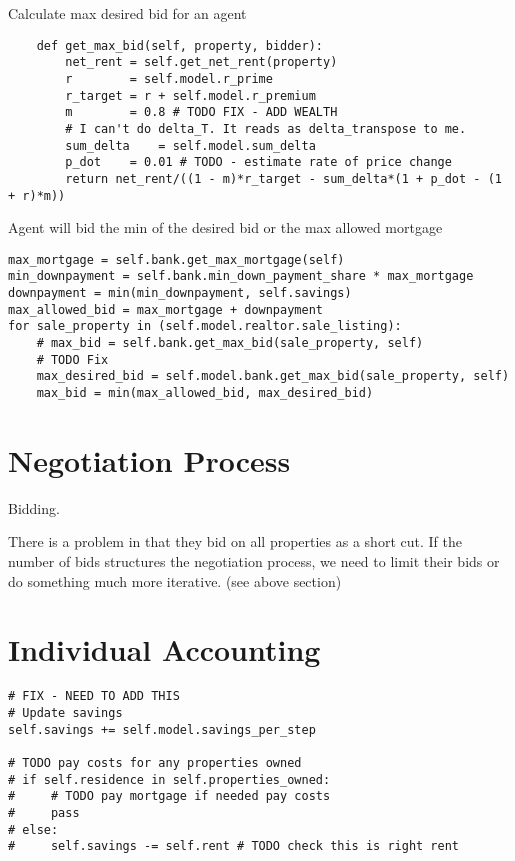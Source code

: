 Calculate max desired bid for an agent
\begin{lstlisting}
    def get_max_bid(self, property, bidder):
        net_rent = self.get_net_rent(property)
        r        = self.model.r_prime   
        r_target = r + self.model.r_premium
        m        = 0.8 # TODO FIX - ADD WEALTH
        # I can't do delta_T. It reads as delta_transpose to me.
        sum_delta    = self.model.sum_delta 
        p_dot    = 0.01 # TODO - estimate rate of price change
        return net_rent/((1 - m)*r_target - sum_delta*(1 + p_dot - (1 + r)*m))
\end{lstlisting}

Agent will bid the min of the desired bid or the max allowed mortgage
\begin{lstlisting}
max_mortgage = self.bank.get_max_mortgage(self)
min_downpayment = self.bank.min_down_payment_share * max_mortgage
downpayment = min(min_downpayment, self.savings)
max_allowed_bid = max_mortgage + downpayment
for sale_property in (self.model.realtor.sale_listing):
    # max_bid = self.bank.get_max_bid(sale_property, self)
    # TODO Fix
    max_desired_bid = self.model.bank.get_max_bid(sale_property, self)
    max_bid = min(max_allowed_bid, max_desired_bid)
\end{lstlisting}

\section{Negotiation Process}

Bidding.

There is a problem in that they bid on all properties as a short cut. If the number of bids structures the negotiation process, we need to limit their bids or do something much more iterative. (see above section)


\section{Individual Accounting}

\begin{lstlisting}
# FIX - NEED TO ADD THIS
# Update savings
self.savings += self.model.savings_per_step

# TODO pay costs for any properties owned
# if self.residence in self.properties_owned:
#     # TODO pay mortgage if needed pay costs
#     pass
# else:
#     self.savings -= self.rent # TODO check this is right rent
\end{lstlisting}